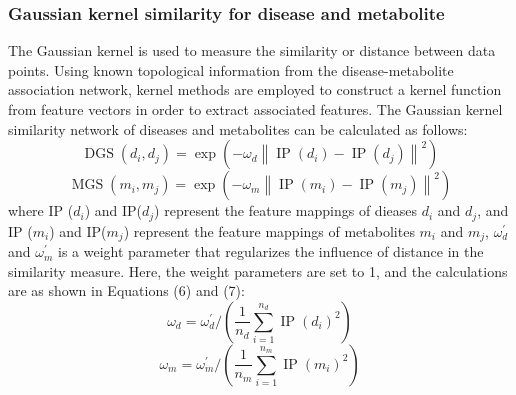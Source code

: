 \documentclass[a4paper,fleqn]{cas-dc}
\begin{document}
\subsubsection{Gaussian kernel similarity for disease and metabolite}
The Gaussian kernel\cite{ter2003gaussian} is used to measure the similarity or distance between data points. Using known topological information from the disease-metabolite association network, kernel methods are employed to construct a kernel function from feature vectors in order to extract associated features. The Gaussian kernel similarity network\cite{van2011gaussian} of diseases and metabolites can be calculated as follows:
\begin{equation}
	\operatorname{DGS}(d_{i}, d_{j})=\exp\left(-\omega_{d}\left\|\operatorname{IP}(d_{i})-\operatorname{IP}(d_{j})\right\|^{2}\right)
\end{equation}
\begin{equation}
	\operatorname{MGS}(m_{i}, m_{j})=\exp\left(-\omega_{m}\left\|\operatorname{IP}(m_{i})-\operatorname{IP}(m_{j})\right\|^{2}\right)
\end{equation}
where IP ($d_{i}$) and  IP($d_{j}$) represent the feature mappings of dieases $d_{i}$ and $d_{j}$, and IP ($m_{i}$) and  IP($m_{j}$) represent the feature mappings of metabolites $m_{i}$ and $m_{j}$, 
$\omega_{d}^{\prime}$ and $\omega_{m}^{\prime}$ is a weight parameter that regularizes the influence of distance in the similarity measure. Here, the weight parameters are set to 1, and the calculations are as shown in Equations (6) and (7):
\begin{equation}
	\omega_{d} = \omega_{d}^{\prime} / \left(\frac{1}{n_{d}} \sum_{i=1}^{n_{d}} \operatorname{IP}(d_{i})^{2}\right)
\end{equation}
\begin{equation}
	\omega_{m} = \omega_{m}^{\prime} / \left(\frac{1}{n_{m}} \sum_{i=1}^{n_{m}} \operatorname{IP}(m_{i})^{2}\right)
\end{equation}
\end{document}
